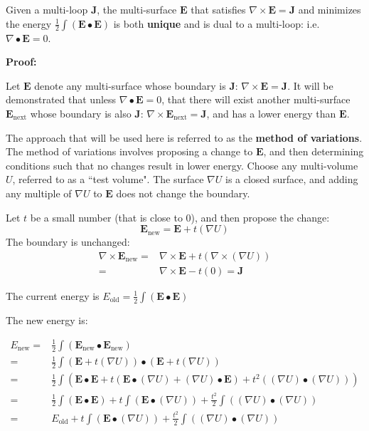 \begin{thm}
Given a multi-loop \(\mathbf{J}\), the multi-surface \(\mathbf{E}\) that satisfies \(\nabla \times \mathbf{E} = \mathbf{J}\) and minimizes the energy \(\frac{1}{2}\int (\mathbf{E} \bullet \mathbf{E})\) is both {\bf unique} and is dual to a multi-loop: i.e. \(\nabla \bullet \mathbf{E} = 0\). 
\end{thm}
\textbf{Proof:}

Let \(\mathbf{E}\) denote any multi-surface whose boundary is \(\mathbf{J}\): \(\nabla \times \mathbf{E} = \mathbf{J}\). It will be demonstrated that unless \(\nabla \bullet \mathbf{E} = 0\), that there will exist another multi-surface \(\mathbf{E}_{\text{next}}\) whose boundary is also \(\mathbf{J}\): \(\nabla \times \mathbf{E}_{\text{next}} = \mathbf{J}\), and has a lower energy than \(\mathbf{E}\). 

The approach that will be used here is referred to as the {\bf method of variations}. The method of variations involves proposing a change to \(\mathbf{E}\), and then determining conditions such that no changes result in lower energy. Choose any multi-volume \(U\), referred to as a ``test volume". The surface \(\nabla U\) is a closed surface, and adding any multiple of \(\nabla U\) to \(\mathbf{E}\) does not change the boundary.

Let \(t\) be a small number (that is close to 0), and then propose the change:
\[\mathbf{E}_{\text{new}} = \mathbf{E} + t(\nabla U)\]
The boundary is unchanged:
\begin{align*}
\nabla \times \mathbf{E}_{\text{new}} = & \nabla \times \mathbf{E} + t(\nabla \times (\nabla U)) \\ 
= & \nabla \times \mathbf{E} - t(0) 
= \mathbf{J}
\end{align*}

The current energy is \(E_{\text{old}} = \frac{1}{2}\int (\mathbf{E} \bullet \mathbf{E})\)

The new energy is: 

\begin{align*}
E_{\text{new}} = & \frac{1}{2}\int (\mathbf{E}_{\text{new}} \bullet \mathbf{E}_{\text{new}}) \\ 
= & \frac{1}{2}\int (\mathbf{E} + t (\nabla U)) \bullet (\mathbf{E} + t (\nabla U)) \\ 
= & \frac{1}{2}\int (\mathbf{E} \bullet \mathbf{E} + t(\mathbf{E} \bullet (\nabla U) + (\nabla U) \bullet \mathbf{E}) + t^2((\nabla U) \bullet (\nabla U))) \\
= & \frac{1}{2}\int (\mathbf{E} \bullet \mathbf{E}) + t\int (\mathbf{E} \bullet (\nabla U)) + \frac{t^2}{2}\int ((\nabla U) \bullet (\nabla U)) \\ 
= & E_{\text{old}} + t\int (\mathbf{E} \bullet (\nabla U)) + \frac{t^2}{2}\int ((\nabla U) \bullet (\nabla U))
\end{align*}


